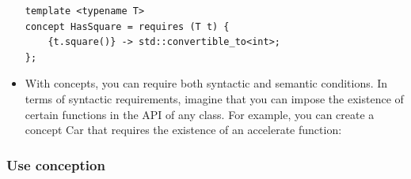 \documentclass[a4paper,11pt,twoside]{book}
\begin{document}
\begin{itemize}
\begin{lstlisting}
template <typename T>
concept HasSquare = requires (T t) {
	{t.square()} -> std::convertible_to<int>;
}; 
\end{lstlisting}

	\item With concepts, you can require both syntactic and semantic conditions. In terms of syntactic requirements, imagine that you can impose the existence of certain functions in the API of any class. For example, you can create a concept Car that requires the existence of an accelerate function:


\end{itemize}

\subsubsection{Use conception}
\end{document}
